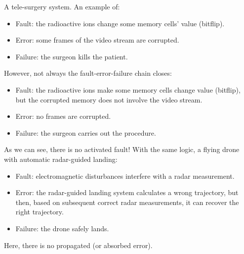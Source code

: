\begin{examplebox}
    A tele-surgery system. An example of:
    \begin{itemize}
        \item Fault: the radioactive ions change some memory cells' value (bitflip).
        \item Error: some frames of the video stream are corrupted.
        \item Failure: the surgeon kills the patient.
    \end{itemize}
    However, not always the fault-error-failure chain closes:
    \begin{itemize}
        \item Fault: the radioactive ions make some memory cells change value (bitflip), but the corrupted memory does not involve the video stream.
        \item Error: no frames are corrupted.
        \item Failure: the surgeon carries out the procedure.
    \end{itemize}
    As we can see, there is no activated fault! With the same logic, a flying drone with automatic radar-guided landing:
    \begin{itemize}
        \item Fault: electromagnetic disturbances interfere with a radar measurement.
        \item Error: the radar-guided landing system calculates a wrong trajectory, but then, based on subsequent correct radar measurements, it can recover the right trajectory.
        \item Failure: the drone safely lands.
    \end{itemize}
    Here, there is no propagated (or absorbed error).
\end{examplebox}
